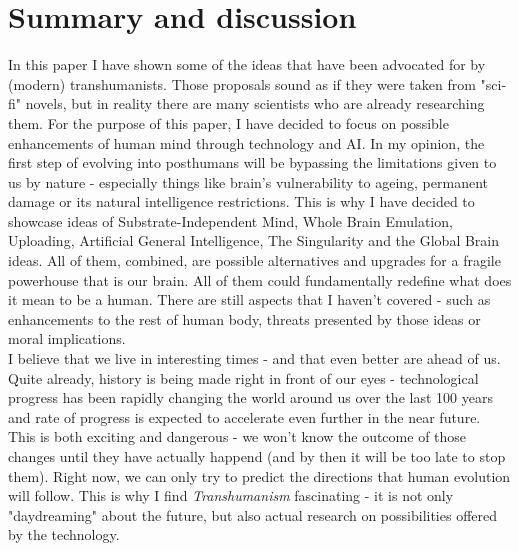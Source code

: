 \documentclass[12pt]{article}
\begin{document}
\section{Summary and discussion} 
	In this paper I have shown some of the ideas that have been advocated for by (modern) transhumanists. Those proposals sound as if they were taken from "sci-fi" novels, but in reality there are many scientists who are already researching them. For the purpose of this paper, I have decided to focus on possible enhancements of human mind through technology and AI. In my opinion, the first step of evolving into posthumans will be bypassing the limitations given to us by nature - especially things like brain's vulnerability to ageing, permanent damage or its natural intelligence restrictions. This is why I have decided to showcase ideas of Substrate-Independent Mind, Whole Brain Emulation, Uploading, Artificial General Intelligence, The Singularity and the Global Brain ideas. All of them, combined, are possible alternatives and upgrades for a fragile powerhouse that is our brain. All of them could fundamentally redefine what does it mean to be a human. There are still aspects that I haven't covered - such as enhancements to the rest of human body, threats presented by those ideas or moral implications. 
	\\I believe that we live in interesting times - and that even better are ahead of us. Quite already, history is being made right in front of our eyes - technological progress has been rapidly changing the world around us over the last 100 years and rate of progress is expected to accelerate even further in the near future. This is both exciting and dangerous - we won't know the outcome of those changes until they have actually happend (and by then it will be too late to stop them). Right now, we can only try to predict the directions that human evolution will follow. This is why I find \emph{Transhumanism} fascinating - it is not only "daydreaming" about the future, but also actual research on possibilities offered by the technology.

\raggedright


\end{document}
